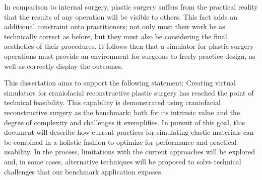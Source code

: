 In comparison to internal surgery, plastic surgery suffers from the
practical reality that the results of any operation will be visible to
others. This fact adds an additional constraint onto practitioners;
not only must their work be as technically correct as before, but they
must also be considering the final aesthetics of their procedures. It
follows then that a simulator for plastic surgery operations must
provide an environment for surgeons to freely practice design, as well
as correctly display the outcomes.

This dissertation aims to support the following statement: Creating
virtual simulators for craniofacial reconstructive plastic surgery has
reached the point of technical feasibility. This capability is
demonstrated using craniofacial reconstructive surgery as the
benchmark; both for its intrinsic value and the degree of complexity
and challenges it exemplifies. In pursuit of this goal, this document
will describe how current practices for simulating elastic materials
can be combined in a holistic fashion to optimize for performance and
practical usability. In the process, limitations with the current
approaches will be explored and, in some cases, alternative techniques
will be proposed to solve technical challenges that our benchmark
application exposes.


